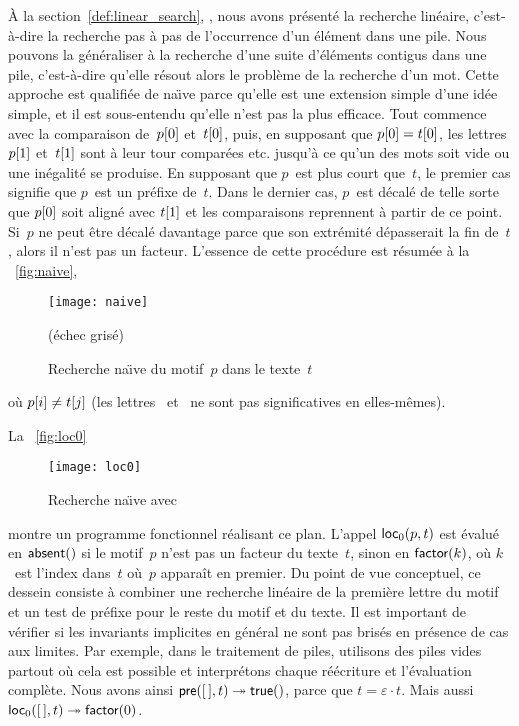 À la section~\ref{def:linear_search}, ,
nous avons présenté la recherche linéaire,
c'est-à-dire la recherche pas à pas de l'occurrence d'un élément dans
une pile. Nous pouvons la généraliser à la recherche d'une suite
d'éléments contigus dans une pile, c'est-à-dire qu'elle résout alors
le problème de la recherche d'un mot. Cette approche est qualifiée de
na\"{\i}ve parce qu'elle est une extension simple d'une idée simple,
et il est sous-entendu qu'elle n'est pas la plus efficace. Tout
commence avec la comparaison de~\({p}[{0}]\) et~\({t}[{0}]\),
puis, en supposant que \({p}[{0}] = {t}[{0}]\), les lettres
\({p}[{1}]\) et~\({t}[{1}]\) sont à leur tour comparées etc.
jusqu'à ce qu'un des mots soit vide ou une inégalité se produise. En
supposant que \(p\)~est plus court que~\(t\), le premier cas signifie
que \(p\)~est un préfixe de~\(t\). Dans le dernier cas, \(p\)~est
décalé de telle sorte que \({p}[{0}]\) soit aligné avec
\({t}[{1}]\) et les comparaisons reprennent à partir de ce
point. Si~\(p\) ne peut être décalé davantage parce que son extrémité
dépasserait la fin de~\(t\), alors il n'est pas un facteur. L'essence
de cette procédure est résumée à la \fig~\vref{fig:naive},
\begin{figure}[t]
\centering
\texttt{[image: naive]}
\caption{Recherche na\"{\i}ve du motif~\(p\) dans le texte~\(t\)}
(échec grisé)
\label{fig:naive}
\end{figure}
où \({p}[{i}] \neq {t}[{j}]\) (les lettres ~et~ ne
sont pas significatives en elles-mêmes).

La \fig~\vref{fig:loc0}
\begin{figure}[t]
\centering
\texttt{[image: loc0]}
\caption{Recherche na\"{\i}ve avec }
\label{fig:loc0}
\end{figure}
montre un programme fonctionnel réalisant ce plan. L'appel
\(\textsf{loc}_0(p,t)\) est évalué en
\(\textsf{absent}()\) si le motif~\(p\) n'est pas un facteur du
texte~\(t\), sinon en \(\textsf{factor}(k)\), où \(k\)~est l'index
dans~\(t\) où~\(p\) apparaît en premier. Du point de vue conceptuel,
ce dessein consiste à combiner une recherche linéaire de la première
lettre du motif et un test de préfixe pour le reste du motif et du
texte. Il est important de vérifier si les invariants implicites en
général ne sont pas brisés en présence de cas aux limites. Par
exemple, dans le traitement de piles, utilisons des piles vides
partout où cela est possible et interprétons chaque réécriture et
l'évaluation complète. Nous avons ainsi \(\textsf{pre}([\,],t)
\twoheadrightarrow \textsf{true}()\), parce que \(t = \varepsilon \cdot
t\). Mais aussi \(\textsf{loc}_0([\,],t) \twoheadrightarrow \textsf{factor}(0)\).

